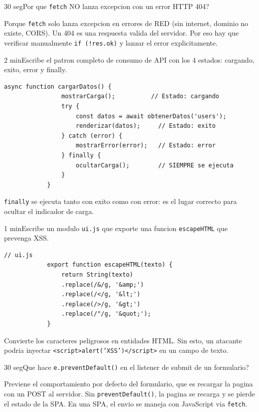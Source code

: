 \documentclass[11pt,a4paper]{article}
\newcounter{nej}
\newcommand{\ej}[2]{%
	\stepcounter{nej}%
	\begin{ejercicio}{\arabic{nej}}{#1}#2\end{ejercicio}\vspace{4pt}}
\begin{document}
	\ej{30 seg}{Por que \texttt{fetch} NO lanza excepcion con un error HTTP 404?}
	
	\begin{respuesta}
		Porque \texttt{fetch} solo lanza excepcion en errores de RED (sin internet, dominio no existe, CORS). Un 404 es una respuesta valida del servidor. Por eso hay que verificar manualmente \texttt{if (!res.ok)} y lanzar el error explicitamente.
	\end{respuesta}
	\vspace{6pt}
	
	\ej{2 min}{Escribe el patron completo de consumo de API con los 4 estados: cargando, exito, error y finally.}
	
	\begin{respuesta}
		\begin{lstlisting}[style=codejs]
			async function cargarDatos() {
				mostrarCarga();          // Estado: cargando
				try {
					const datos = await obtenerDatos('users');
					renderizar(datos);     // Estado: exito
				} catch (error) {
					mostrarError(error);   // Estado: error
				} finally {
					ocultarCarga();        // SIEMPRE se ejecuta
				}
			}
		\end{lstlisting}
		\texttt{finally} se ejecuta tanto con exito como con error: es el lugar correcto para ocultar el indicador de carga.
	\end{respuesta}
	\vspace{6pt}
	
	\ej{1 min}{Escribe un modulo \texttt{ui.js} que exporte una funcion \texttt{escapeHTML} que prevenga XSS.}
	
	\begin{respuesta}
		\begin{lstlisting}[style=codejs]
			// ui.js
			export function escapeHTML(texto) {
				return String(texto)
				.replace(/&/g, '&amp;')
				.replace(/</g, '&lt;')
				.replace(/>/g, '&gt;')
				.replace(/"/g, '&quot;');
			}
		\end{lstlisting}
		Convierte los caracteres peligrosos en entidades HTML. Sin esto, un atacante podria inyectar \texttt{<script>alert('XSS')</script>} en un campo de texto.
	\end{respuesta}
	\vspace{6pt}
	
	\ej{30 seg}{Que hace \texttt{e.preventDefault()} en el listener de submit de un formulario?}
	
	\begin{respuesta}
		Previene el comportamiento por defecto del formulario, que es recargar la pagina con un POST al servidor. Sin \texttt{preventDefault()}, la pagina se recarga y se pierde el estado de la SPA. En una SPA, el envio se maneja con JavaScript via \texttt{fetch}.
	\end{respuesta}
	\vspace{6pt}
	
\end{document}
